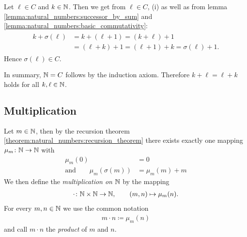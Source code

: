 \begin{solution}
\begin{proofenumerate}
         Let $\ell\in C$ and $k\in\mathbb{N}$. Then we get from $\ell\in C$, (i) as well as from lemma \ref{lemma:natural_numbers:successor_by_sum} and \ref{lemma:natural_numbers:basic_commutativity}:
        \begin{align}\begin{split}
            k+\sigma(\ell)&=k+(\ell+1)=(k+\ell)+1\\&=(\ell+k)+1=(\ell+1)+k=\sigma(\ell)+1.
        \end{split}\end{align}
        Hence $\sigma(\ell)\in C$.

        In summary, $\mathbb{N}=C$ follows by the induction axiom. Therefore $k+\ell=\ell+k$ holds for all $k,\ell\in\mathbb{N}$.
    \end{proofenumerate}
\end{solution}

\subsection{Multiplication}

\begin{definition}[Multiplication]\label{definition:natural_numbers:multiplication}
    Let $m\in\mathbb{N}$, then by the recursion theorem \ref{theorem:natural_numbers:recursion_theorem} there exists exactly one mapping $\mu_m\colon\mathbb{N}\to\mathbb{N}$ with
    \begin{align}
    \mu_m(0)&=0\\
    \text{and}\qquad \mu_m(\sigma(m))&=\mu_m(m)+m
    \end{align}
    We then define the \emph{multiplication on $\mathbb{N}$} by the mapping
    \begin{align}\cdot\colon\mathbb{N}\times\mathbb{N}\to\mathbb{N},\qquad (m,n)\mapsto \mu_m(n).\end{align}
    For every $m,n\in\mathbb{N}$ we use the common notation
    \begin{align}m\cdot n\coloneq \mu_m(n)\end{align}
    and call $m\cdot n$ the \emph{product} of $m$ and $n$.
\end{definition}


